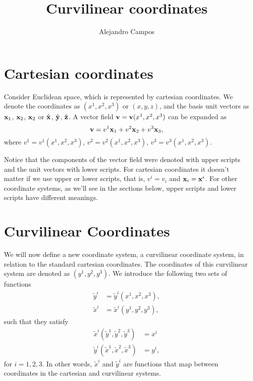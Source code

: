 \documentclass[11pt]{article}
\title{Curvilinear coordinates}
\author{Alejandro Campos}
\newcommand{\xtilde}{\tilde{x}}
\newcommand{\ytilde}{\tilde{y}}
\begin{document}
\maketitle
\tableofcontents

\section{Cartesian coordinates}
Consider Euclidean space, which is represented by cartesian coordinates. We denote the coordinates as $(x^1,x^2,x^3)$ or $(x,y,z)$, and the basis unit vectors as $\mathbf{x}_1$, $\mathbf{x}_2$, $\mathbf{x}_2$ or $\hat{\mathbf{x}}$, $\hat{\mathbf{y}}$, $\hat{\mathbf{z}}$. A vector field $\mathbf{v} = \mathbf{v}(x^1, x^2, x^3)$ can be expanded as 
\begin{equation}
    \label{eq:vector_cartesian}
    \mathbf{v} = v^1 \mathbf{x}_1 + v^2 \mathbf{x}_2 + v^3 \mathbf{x}_3,
\end{equation}
where $v^1 = v^1(x^1, x^2, x^3)$, $v^2 = v^2(x^1, x^2, x^3)$, $v^3 = v^3(x^1, x^2, x^3)$. 

Notice that the components of the vector field were denoted with upper scripts and the unit vectors with lower scripts. For cartesian coordinates it doesn't matter if we use upper or lower scripts, that is, $v^i = v_i$ and $\mathbf{x}_i=\mathbf{x}^i$. For other coordinate systems, as we'll see in the sections below, upper scripts and lower scripts have different meanings.

\section{Curvilinear Coordinates}
We will now define a new coordinate system, a curvilinear coordinate system, in relation to the standard cartesian coordinates. The coordinates of this curvilinear system are denoted as $(y^1, y^2, y^3)$. We introduce the following two sets of functions
\begin{align}
\ytilde^i &= \ytilde^i(x^1, x^2, x^3), \label{eq:generic_xtoy} \\
\xtilde^i &= \xtilde^i(y^1,y^2,y^3), \label{eq:generic_ytox}
\end{align}
such that they satisfy
\begin{align}
    \xtilde^i(\ytilde^1, \ytilde^2, \ytilde^3) &= x^i \label{eq:trans1}\\
    \ytilde^i(\xtilde^1, \xtilde^2, \xtilde^3) &= y^i \label{eq:trans2},
\end{align}
for $i=1,2,3$. In other words, $\xtilde^i$ and $\ytilde^i$ are functions that map between coordinates in the cartesian and curvilinear systems. 
\end{document}
